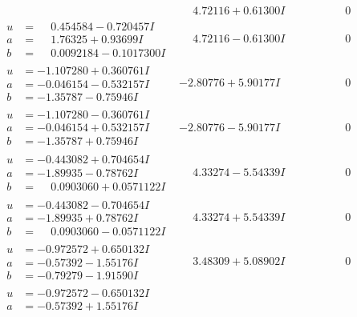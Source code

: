 \documentclass[1p]{elsarticle_modified}
\theoremstyle{definition}
\begin{document}
$$\begin{array}{c|c|c}
 & \phantom{-}4.72116 + 0.61300 I & \phantom{-0.000000 } 0 \\ \hline\begin{aligned}
u &= \phantom{-}0.454584 - 0.720457 I \\
a &= \phantom{-}1.76325 + 0.93699 I \\
b &= \phantom{-}0.0092184 - 0.1017300 I\end{aligned}
 & \phantom{-}4.72116 - 0.61300 I & \phantom{-0.000000 } 0 \\ \hline\begin{aligned}
u &= -1.107280 + 0.360761 I \\
a &= -0.046154 - 0.532157 I \\
b &= -1.35787 - 0.75946 I\end{aligned}
 & -2.80776 + 5.90177 I & \phantom{-0.000000 } 0 \\ \hline\begin{aligned}
u &= -1.107280 - 0.360761 I \\
a &= -0.046154 + 0.532157 I \\
b &= -1.35787 + 0.75946 I\end{aligned}
 & -2.80776 - 5.90177 I & \phantom{-0.000000 } 0 \\ \hline\begin{aligned}
u &= -0.443082 + 0.704654 I \\
a &= -1.89935 - 0.78762 I \\
b &= \phantom{-}0.0903060 + 0.0571122 I\end{aligned}
 & \phantom{-}4.33274 - 5.54339 I & \phantom{-0.000000 } 0 \\ \hline\begin{aligned}
u &= -0.443082 - 0.704654 I \\
a &= -1.89935 + 0.78762 I \\
b &= \phantom{-}0.0903060 - 0.0571122 I\end{aligned}
 & \phantom{-}4.33274 + 5.54339 I & \phantom{-0.000000 } 0 \\ \hline\begin{aligned}
u &= -0.972572 + 0.650132 I \\
a &= -0.57392 - 1.55176 I \\
b &= -0.79279 - 1.91590 I\end{aligned}
 & \phantom{-}3.48309 + 5.08902 I & \phantom{-0.000000 } 0 \\ \hline\begin{aligned}
u &= -0.972572 - 0.650132 I \\
a &= -0.57392 + 1.55176 I \\

\end{aligned}
\end{array}$$
\end{document}
